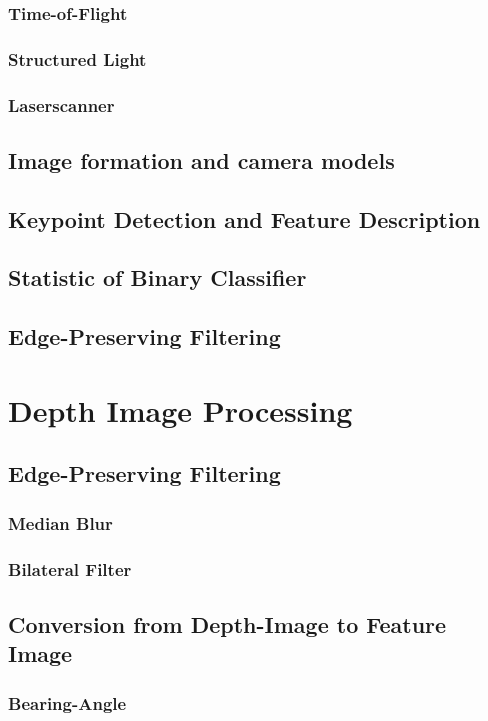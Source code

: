 \subsubsection{Time-of-Flight}
\subsubsection{Structured Light}
\subsubsection{Laserscanner}

\subsection{Image formation and camera models}

\subsection{Keypoint Detection and Feature Description}
\subsection{Statistic of Binary Classifier}
\subsection{Edge-Preserving Filtering}

\section{Depth Image Processing}

\subsection{Edge-Preserving Filtering}
\subsubsection{Median Blur}
\subsubsection{Bilateral Filter}

\subsection{Conversion from Depth-Image to Feature Image}
\subsubsection{Bearing-Angle}
